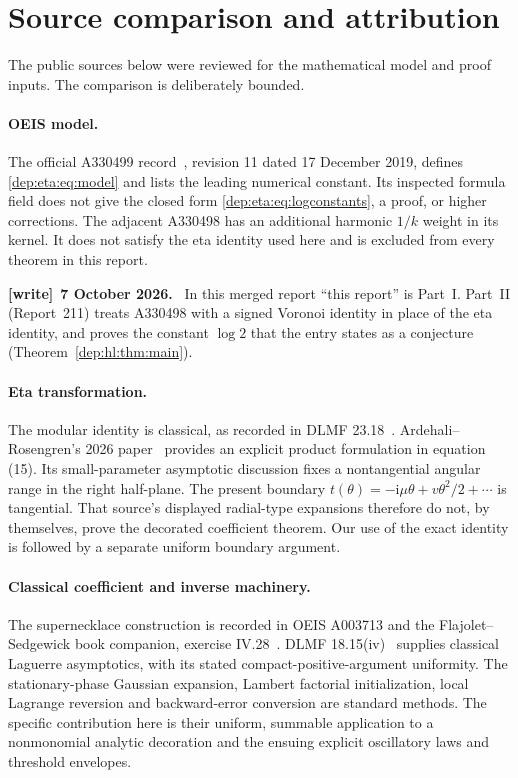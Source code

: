 \documentclass[11pt]{article}
\theoremstyle{definition}\newtheorem{definition}[theorem]{Definition}
\theoremstyle{remark}\newtheorem{remark}[theorem]{Remark}
\newcommand{\ii}{\mathrm i}
\newenvironment{writenote}[1][]{\par\smallskip\begingroup\small
 \noindent\textbf{[write]}\if\relax\detokenize{#1}\relax\else~\textbf{#1.}\fi\ }%
 {\par\endgroup\smallskip}
\begin{document}
\section{Source comparison and attribution}\label{dep:eta:sec:sources}
The public sources below were reviewed for the mathematical model and
proof inputs. The comparison is deliberately bounded.

\paragraph{OEIS model.}
The official A330499 record~\cite{oeisA330499}, revision 11 dated
17 December 2019, defines \eqref{dep:eta:eq:model} and lists the leading
numerical constant. Its inspected formula field does not give the
closed form \eqref{dep:eta:eq:logconstants}, a proof, or higher corrections.
The adjacent A330498 has an additional harmonic $1/k$ weight in its
kernel. It does not satisfy the eta identity used here and is excluded
from every theorem in this report.

\begin{writenote}[7 October 2026]
In this merged report ``this report'' is Part~I. Part~II (Report~211) treats A330498 with a signed Voronoi identity in place of the eta identity, and proves the constant $\log2$ that the entry states as a conjecture (Theorem~\ref{dep:hl:thm:main}).
\end{writenote}

\paragraph{Eta transformation.}
The modular identity is classical, as recorded in DLMF
23.18~\cite{eta}. Ardehali--Rosengren's 2026 paper~\cite{ardehali}
provides an explicit product formulation in equation (15). Its
small-parameter asymptotic discussion fixes a nontangential angular
range in the right half-plane. The present boundary
$t(\theta)=-\ii\mu\theta+v\theta^2/2+\cdots$ is tangential.
That source's displayed radial-type expansions therefore do not,
by themselves, prove the decorated coefficient theorem. Our use of
the exact identity is followed by a separate uniform boundary argument.

\paragraph{Classical coefficient and inverse machinery.}
The supernecklace construction is recorded in OEIS A003713 and the
Flajolet--Sedgewick book companion, exercise IV.28~\cite{supernecklace,ac}.
DLMF 18.15(iv)~\cite{laguerre} supplies classical Laguerre
asymptotics, with its stated compact-positive-argument uniformity.
The stationary-phase Gaussian expansion, Lambert factorial
initialization, local Lagrange reversion and backward-error conversion
are standard methods. The specific contribution here is their
uniform, summable application to a nonmonomial analytic decoration
and the ensuing explicit oscillatory laws and threshold envelopes.
\end{document}
